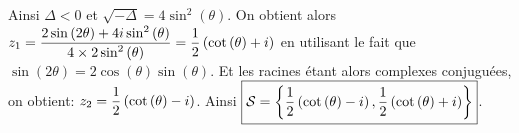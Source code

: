 \documentclass[a4paper, 11pt]{article}
\begin{document}
\begin{correction}
\begin{enumerate}
\begin{itemize}
Ainsi $\Delta<0$ et $\sqrt{-\Delta}=4\sin^2{(\theta)}$.
On obtient alors $z_1=\displaystyle\frac{ 2\sin{(2\theta)} +4i\sin^2{(\theta)}  }{ 4\times 2\sin^2{(\theta)}}=\displaystyle\frac{1}{2}\left( \cot{(\theta)}+i \right)$
en utilisant le fait que $\sin{(2\theta)}=2\cos{(\theta)}\sin{(\theta)}$. Et les racines \'etant alors complexes conjugu\'ees, on obtient: $z_2=\displaystyle\frac{1}{2}\left( \cot{(\theta)}-i \right)$. Ainsi $\fbox{$ \mathcal{S}=\left\lbrace \displaystyle\frac{1}{2}\left( \cot{(\theta)}-i \right),\displaystyle\frac{1}{2}\left( \cot{(\theta)}+i \right) \right\rbrace $}$.
\end{itemize}

\end{enumerate}
\end{correction}
\end{document}

